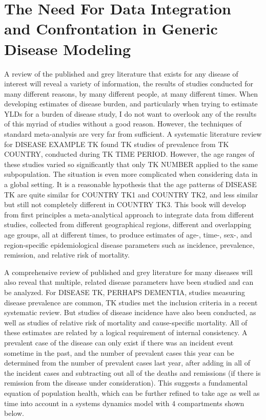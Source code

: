 \section[Need for Confrontation]{The Need For Data Integration and Confrontation in Generic Disease Modeling}

A review of the published and grey literature that exists for any
disease of interest will reveal a variety of information, the results
of studies conducted for many different reasons, by many different
people, at many different times. When developing estimates of disease
burden, and particularly when trying to estimate YLDs for a burden of
disease study, I do not want to overlook any of the results of this
myriad of studies without a good reason. However, the techniques of
standard meta-analysis are very far from sufficient. A systematic
literature review for DISEASE EXAMPLE TK found TK studies of
prevalence from TK COUNTRY, conducted during TK TIME PERIOD.  However,
the age ranges of these studies varied so significantly that only TK
NUMBER applied to the same subpopulation.  The situation is even more
complicated when considering data in a global setting. It is a
reasonable hypothesis that the age patterns of DISEASE TK are quite
similar for COUNTRY TK1 and COUNTRY TK2, and less similar but still
not completely different in COUNTRY TK3. This book will develop from
first principles a meta-analytical approach to integrate data from
different studies, collected from different geographical regions,
different and overlapping age groups, all at different times, to
produce estimates of age-, time-, sex-, and region-specific
epidemiological disease parameters such as incidence, prevalence,
remission, and relative risk of mortality.

A comprehensive review of published and grey literature for many
diseases will also reveal that multiple, related disease parameters
have been studied and can be analyzed. For DISEASE TK, PERHAPS
DEMENTIA, studies measuring disease prevalence are common, TK studies
met the inclusion criteria in a recent systematic review. But studies of
disease incidence have also been conducted, as well as studies of
relative risk of mortality and cause-specific mortality. All of these
estimates are related by a logical requirement of internal
consistency.  A prevalent case of the disease can only exist if there
was an incident event sometime in the past, and the number of
prevalent cases this year can be determined from the number of
prevalent cases last year, after adding in all of the incident cases
and subtracting out all of the deaths and remissions (if there is
remission from the disease under consideration).  This suggests a
fundamental equation of population health, which can be further
refined to take age as well as time into account in a systems dynamics
model with 4 compartments shown below.

